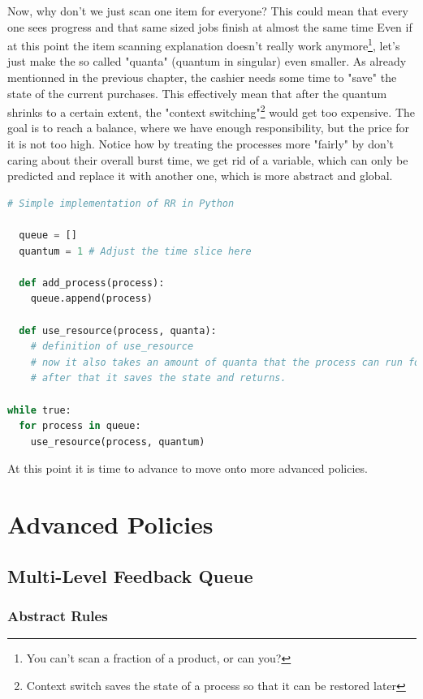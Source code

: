 \documentclass{report}
\newcounter{defi}[section]\setcounter{defi}{0}
\begin{document}
Now, why don't we just scan one item for everyone? 
This could mean that every one sees progress and that same sized jobs finish at almost the same time
Even if at this point the item scanning explanation doesn't really work anymore\footnote{You can't scan a fraction of a product, or can you?}, let's just make the so called "quanta" (quantum in singular) even smaller.
As already mentionned in the previous chapter, the cashier needs some time to "save" the state of the current purchases. 
This effectively mean that after the quantum shrinks to a certain extent, the "context switching"\footnote{Context switch saves the state of a process so that it can be restored later} would get too expensive. 
The goal is to reach a balance, where we have enough responsibility, but the price for it is not too high.
Notice how by treating the processes more "fairly" by don't caring about their overall burst time, we get rid of a variable, which can only be predicted and replace it with another one, which is more abstract and global.
\pagebreak
\begin{lstlisting}[language=Python, style=colorEX, label=cd:rr-python]
  # Simple implementation of RR in Python

  queue = []
  quantum = 1 # Adjust the time slice here

  def add_process(process):
    queue.append(process)

  def use_resource(process, quanta):
    # definition of use_resource
    # now it also takes an amount of quanta that the process can run for
    # after that it saves the state and returns.

while true:
  for process in queue:
    use_resource(process, quantum)

\end{lstlisting}

At this point it is time to advance to move onto more advanced policies.

\part{Advanced Policies}


\chapter{Multi-Level Feedback Queue}

\section{Abstract Rules}
\end{document}
